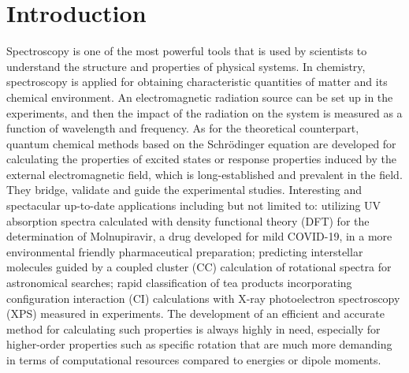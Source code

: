 \chapter{Introduction}  \label{intro} 
Spectroscopy is one of the most powerful tools that is used by scientists to understand the structure and properties of physical systems. In chemistry, spectroscopy is applied for obtaining characteristic quantities of matter and its chemical environment. An electromagnetic radiation source can be set up in the experiments, and then the impact of the radiation on the system is measured as a function of wavelength and frequency.\cite{Svanberg2023} As for the theoretical counterpart, quantum chemical methods based on the Schr\"odinger equation are developed for calculating the properties of excited states or response properties induced by the external electromagnetic field, which is long-established and prevalent in the field.\cite{Szabo2012, Helgaker2013} They bridge, validate and guide the experimental studies. Interesting and spectacular up-to-date applications including but not limited to: utilizing UV absorption spectra calculated with density functional theory (DFT) for the determination of Molnupiravir, a drug developed for mild COVID-19, in a more environmental friendly pharmaceutical preparation;\cite{Abdelazim2023} predicting interstellar molecules guided by a coupled cluster (CC) calculation of rotational spectra for astronomical searches;\cite{Puzzarini2023} rapid classification of tea products incorporating configuration interaction (CI) calculations with X-ray photoelectron spectroscopy (XPS) measured in experiments.\cite{Jiang2022} The development of an efficient and accurate method for calculating such properties is always highly in need, especially for higher-order properties such as specific rotation that are much more demanding in terms of computational resources compared to energies or dipole moments.\cite{Pecul2005, Crawford2007, Bohle2021}

